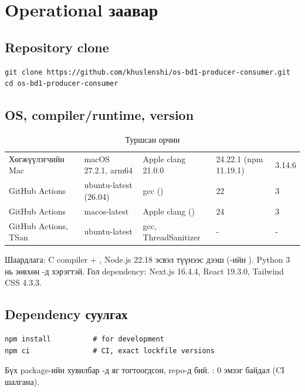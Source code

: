 \documentclass[12pt,a4paper]{article}
\begin{document}

\section{Operational заавар}

\subsection{Repository clone}
\begin{lstlisting}[style=shell]
git clone https://github.com/khuslenshi/os-bd1-producer-consumer.git
cd os-bd1-producer-consumer
\end{lstlisting}

\subsection{OS, compiler/runtime, version}
\begin{table}[H]\centering\small
\caption{Туршсан орчин}\label{tab:env}
\begin{tabular}{|L{0.22\textwidth}|L{0.2\textwidth}|L{0.22\textwidth}|L{0.2\textwidth}|L{0.16\textwidth}|}\hline
{} &  &  &  &  \\\hline
Хөгжүүлэгчийн Mac & macOS 27.2.1, arm64 & Apple clang 21.0.0 & 24.22.1 (npm 11.19.1) & 3.14.6 \\\hline
GitHub Actions & ubuntu-latest (26.04) & gcc () & 22 & 3 \\\hline
GitHub Actions & macos-latest & Apple clang () & 24 & 3 \\\hline
GitHub Actions, TSan & ubuntu-latest & gcc, ThreadSanitizer & - & - \\\hline
\end{tabular}
\end{table}
Шаардлага: C compiler + , Node.js 22.18 эсвэл түүнээс дээш (-ийн ). Python 3 нь зөвхөн -д хэрэгтэй. Гол dependency: Next.js 16.4.4, React 19.3.0, Tailwind CSS 4.3.3.

\subsection{Dependency суулгах}
\begin{lstlisting}[style=shell]
npm install          # for development
npm ci               # CI, exact lockfile versions
\end{lstlisting}
Бүх package-ийн хувилбар -д яг тогтоогдсон,  repo-д бий. : 0 эмзэг байдал (CI шалгана).
\end{document}
